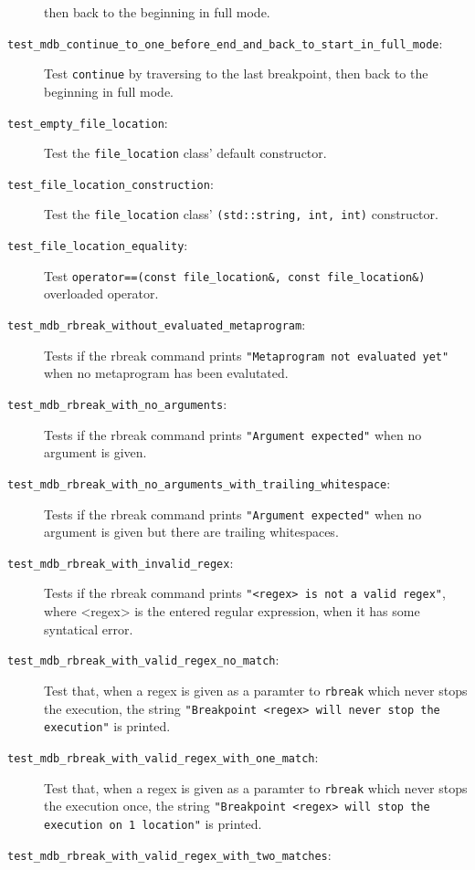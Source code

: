 \begin{description}
        then back to the beginning in full mode.
    \item[\texttt{test\_mdb\_continue\_to\_one\_before\_end\_and\_back\_to\_start\_in\_full\_mode}:]
        Test \texttt{continue} by traversing to the last breakpoint, then back
        to the beginning in full mode.
    \item[\texttt{test\_empty\_file\_location}:]
        Test the \texttt{file\_location} class' default constructor.
    \item[\texttt{test\_file\_location\_construction}:]
        Test the \texttt{file\_location} class'
        \texttt{(std::string, int, int)} constructor.
    \item[\texttt{test\_file\_location\_equality}:]
        Test \texttt{operator==(const file\_location\&, const file\_location\&)}
        overloaded operator.
    \item[\texttt{test\_mdb\_rbreak\_without\_evaluated\_metaprogram}:]
        Tests if the rbreak command prints
        \texttt{"Metaprogram not evaluated yet"} when no metaprogram has been
        evalutated.
    \item[\texttt{test\_mdb\_rbreak\_with\_no\_arguments}:]
        Tests if the rbreak command prints
        \texttt{"Argument expected"} when no argument is given.
    \item[\texttt{test\_mdb\_rbreak\_with\_no\_arguments\_with\_trailing\_whitespace}:]
        Tests if the rbreak command prints
        \texttt{"Argument expected"} when no argument is given but there are
        trailing whitespaces.
    \item[\texttt{test\_mdb\_rbreak\_with\_invalid\_regex}:]
        Tests if the rbreak command prints
        \texttt{"<regex> is not a valid regex"}, where <regex> is the entered
        regular expression, when it has some syntatical error.
    \item[\texttt{test\_mdb\_rbreak\_with\_valid\_regex\_no\_match}:]
        Test that, when a regex is given as a paramter to \texttt{rbreak} which
        never stops the execution, the string
        \texttt{"Breakpoint <regex> will never stop the execution"} is
        printed.
    \item[\texttt{test\_mdb\_rbreak\_with\_valid\_regex\_with\_one\_match}:]
        Test that, when a regex is given as a paramter to \texttt{rbreak} which
        never stops the execution once, the string
        \texttt{"Breakpoint <regex> will stop the execution on 1 location"} is
        printed.
    \item[\texttt{test\_mdb\_rbreak\_with\_valid\_regex\_with\_two\_matches}:]

\end{description}
